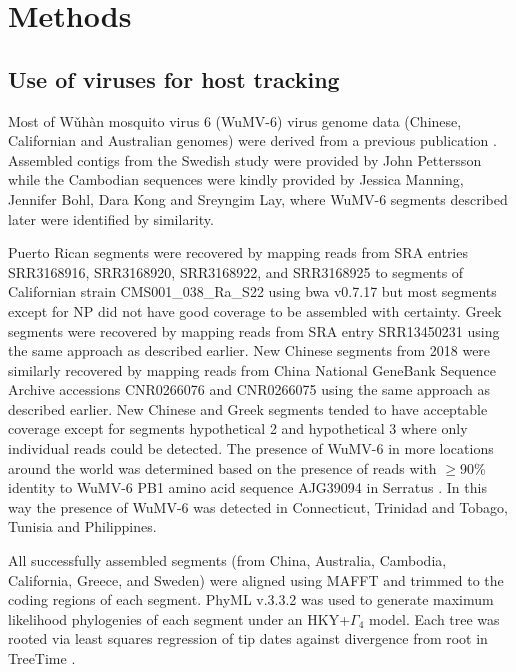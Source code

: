 \documentclass[11pt,twocolumn]{article}
\begin{document}
\section{Methods}

\subsection{Use of viruses for host tracking}

Most of W\v{u}h\`{a}n mosquito virus 6 (WuMV-6) virus genome data (Chinese, Californian and Australian genomes) were derived from a previous publication \citep{batson_single_2021}.
Assembled contigs from the Swedish study \citep{pettersson_meta-transcriptomic_2019} were provided by John Pettersson while the Cambodian sequences were kindly provided by Jessica Manning, Jennifer Bohl, Dara Kong and Sreyngim Lay, where WuMV-6 segments described later \citep{batson_single_2021} were identified by similarity.

Puerto Rican segments were recovered by mapping reads from SRA entries SRR3168916, SRR3168920, SRR3168922, and SRR3168925 \citep{frey_bioinformatic_2016} to segments of Californian strain CMS001\_038\_Ra\_S22 using bwa v0.7.17 \citep{li_fast_2009} but most segments except for NP did not have good coverage to be assembled with certainty.
Greek segments were recovered by mapping reads from SRA entry SRR13450231 \citep{konstantinidis_defining_2021} using the same approach as described earlier.
New Chinese segments from 2018 \citep{he_metagenomic_2021} were similarly recovered by mapping reads from China National GeneBank Sequence Archive accessions CNR0266076 and CNR0266075 using the same approach as described earlier.
New Chinese and Greek segments tended to have acceptable coverage except for segments hypothetical 2 and hypothetical 3 where only individual reads could be detected.
The presence of WuMV-6 in more locations around the world was determined based on the presence of reads with $\geq$90\% identity to WuMV-6 PB1 amino acid sequence AJG39094 in Serratus \citep{edgar_petabase-scale_2022}.
In this way the presence of WuMV-6 was detected in Connecticut, Trinidad and Tobago, Tunisia and Philippines.

All successfully assembled segments (from China, Australia, Cambodia, California, Greece, and Sweden) were aligned using MAFFT \citep{katoh_mafft_2005} and trimmed to the coding regions of each segment.
PhyML v.3.3.2 was used to generate maximum likelihood phylogenies of each segment under an HKY+$\Gamma_{4}$ \citep{hasegawa_dating_1985,yang_maximum_1994} model.
Each tree was rooted via least squares regression of tip dates against divergence from root in TreeTime \citep{sagulenko_treetime_2018}.
\end{document}
